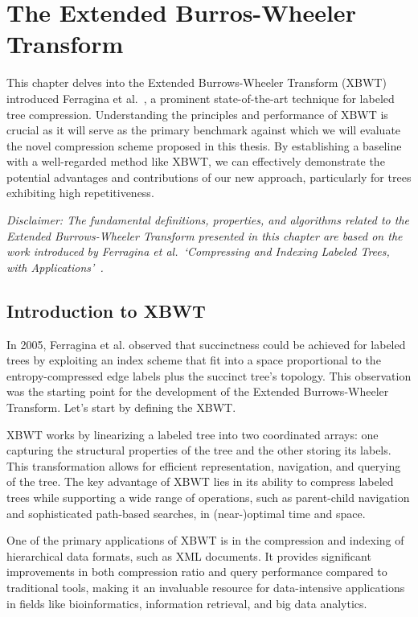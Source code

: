 \chapter{The Extended Burros-Wheeler Transform} \label{chp:tree_compression}
This chapter delves into the Extended Burrows-Wheeler Transform (XBWT) introduced Ferragina et al.~\cite{ferragina2009compressing}, a prominent state-of-the-art technique for labeled tree compression. Understanding the principles and performance of XBWT is crucial as it will serve as the primary benchmark against which we will evaluate the novel compression scheme proposed in this thesis. By establishing a baseline with a well-regarded method like XBWT, we can effectively demonstrate the potential advantages and contributions of our new approach, particularly for trees exhibiting high repetitiveness.

\textit{Disclaimer: The fundamental definitions, properties, and algorithms related to the Extended Burrows-Wheeler Transform presented in this chapter are based on the work introduced by Ferragina et al.~`Compressing and Indexing Labeled Trees, with Applications'~\cite{ferragina2009compressing}.}

\section{Introduction to XBWT} 
In 2005, Ferragina et al. \cite{ferragina2009compressing} observed that succinctness could be achieved for labeled trees by exploiting an index scheme that fit into a space proportional to the entropy-compressed edge labels plus the succinct tree's topology. This observation was the starting point for the development of the Extended Burrows-Wheeler Transform. Let's start by defining the XBWT.

XBWT works by linearizing a labeled tree into two coordinated arrays: one capturing the structural properties of the tree and the other storing its labels. This transformation allows for efficient representation, navigation, and querying of the tree. The key advantage of XBWT lies in its ability to compress labeled trees while supporting a wide range of operations, such as parent-child navigation and sophisticated path-based searches, in (near-)optimal time and space.

One of the primary applications of XBWT is in the compression and indexing of hierarchical data formats, such as XML documents. It provides significant improvements in both compression ratio and query performance compared to traditional tools, making it an invaluable resource for data-intensive applications in fields like bioinformatics, information retrieval, and big data analytics.

